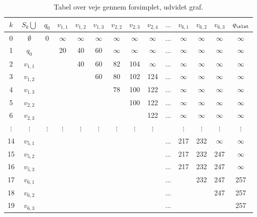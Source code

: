 \begin{table}[H]
\centering
\begin{tabular}{|c|c|c|c|c|c|c|c|c|c|c|c|c|c|} 
\hline
$k$ & $S_k \bigcup$ & $q_{0}$ & $v_{1,1}$ & $v_{1,2}$ & $v_{1,3}$ & $v_{2,2}$ & $v_{2,3}$ & $v_{2,4}$ & $\ldots$ & $v_{6,1}$ & $v_{6,2}$ & $v_{6,3}$ & $q_{\slut}$ \\
\hline
0 & $\emptyset$ & 0 & $\infty$ & $\infty$ & $\infty$ & $\infty$ & $\infty$ & $\infty$ & $\ldots$ & $\infty$ & $\infty$ & $\infty$ & $\infty$ \\ 
1 & $q_{0}$ & & 20 & 40 & 60 & $\infty$ & $\infty$ & $\infty$ & $\ldots$ & $\infty$ & $\infty$ & $\infty$ & $\infty$\\ 
2 & $v_{1,1}$ & & & 40 & 60 & 82 & 104 & $\infty$ & $\ldots$ & $\infty$ & $\infty$ & $\infty$ & $\infty$\\ 
3 & $v_{1,2}$ & & & & 60 & 80 & 102 & 124 & $\ldots$ & $\infty$ & $\infty$ & $\infty$ & $\infty$\\
4 & $v_{1,3}$ & & & & & 78 & 100 & 122 & $\ldots$ & $\infty$ & $\infty$ & $\infty$ & $\infty$\\ 
5 & $v_{2,2}$ & & & & & & 100 & 122 & $\ldots$ & $\infty$ & $\infty$ & $\infty$ & $\infty$\\ 
6 & $v_{2,3}$ & & & & & & & 122 & $\ldots$ & $\infty$ & $\infty$ & $\infty$ & $\infty$\\  
$\vdots$ & $\vdots$ & $\vdots$ & $\vdots$ & $\vdots$ & $\vdots$ & $\vdots$ & $\vdots$ & $\vdots$ &  & $\vdots$ & $\vdots$ & $\vdots$ & $\vdots$\\ 
14 & $v_{5,1}$ &  &  &  &  &  &  &  & $\ldots$ & 217 & 232 & $\infty$ & $\infty$\\ 
15 & $v_{5,2}$ &  &  &  &  &  &  &  & $\ldots$ & 217 & 232 & 247 & $\infty$\\ 
16 & $v_{5,3}$ &  &  &  &  &  &  &  & $\ldots$ & 217 & 232 & 247 & $\infty$\\ 
17 & $v_{6,1}$ &  &  &  &  &  &  &  & $\ldots$ &  & 232 & 247 & 257\\ 
18 & $v_{6,2}$ &  &  &  &  &  &  &  & $\ldots$ &  &  & 247 & 257\\ 
19 & $v_{6,3}$ &  &  &  &  &  &  &  & $\ldots$ &  &  &  & 257\\ 
\hline
\end{tabular}
\caption{Tabel over veje gennem forsimplet, udvidet graf.}
\label{table:forsimplet_udvidet_graf}
\end{table}